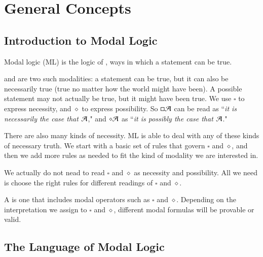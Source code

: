 %
%
%
\chapter{General Concepts}
\label{GenCon} %


\section{ Introduction to Modal Logic}

Modal logic (ML) is the logic of , ways in which a statement can be true.

\begin{example}
     and  are two such modalities: a statement can be true, but it can also be necessarily true (true no matter how the world might have been). A possible statement may not actually be true, but it might have been true. We use $\square$ to express necessity, and $\diamond$ to express possibility. So $\square\mathcal{A}$ can be read as ``\emph{it is necessarily the case that $\mathcal{A}$}," and $\diamond\mathcal{A}$ as ``\emph{it is possibly the case that $\mathcal{A}$}."
\end{example}

There are also many kinds of necessity. ML is able to deal with any of these kinds of necessary truth. We start with a basic set of rules that govern $\square$ and $\diamond$, and then we add more rules as needed to fit the kind of modality we are interested in. 


We actually do not nead to read $\square$ and $\diamond$ as necessity and possibility. All we need is choose the right rules for different readings of $\square$ and $\diamond$.

\begin{definition}
    A  is one that includes modal operators such as $\square$ and $\diamond$. Depending on the interpretation we assign to $\square$ and $\diamond$, different modal formulas will be provable or valid.
\end{definition}


\section{ The Language of Modal Logic}

